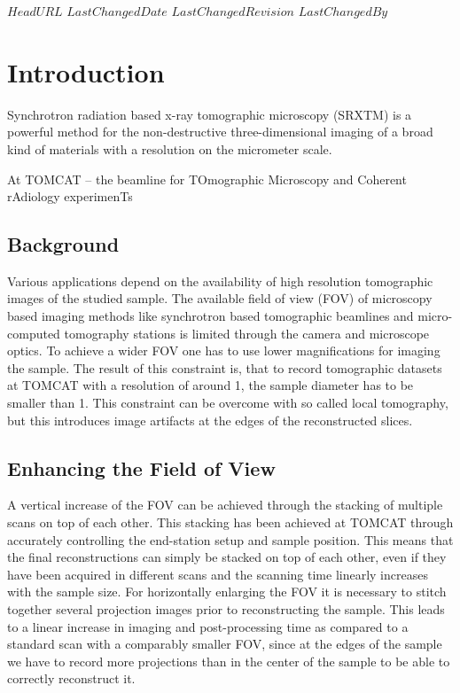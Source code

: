 \svnidlong
{$HeadURL$}
{$LastChangedDate$}
{$LastChangedRevision$}
{$LastChangedBy$}
\section{Introduction}

Synchrotron radiation based x-ray tomographic microscopy (SRXTM) is a powerful method for the non-destructive three-dimensional imaging of a broad kind of materials with a resolution on the micrometer scale.

At TOMCAT -- the beamline for TOmographic Microscopy and Coherent rAdiology experimenTs%

\subsection{Background}
Various applications depend on the availability of high resolution tomographic images of the studied sample. The available field of view (FOV) of microscopy based imaging methods like synchrotron based tomographic beamlines and micro-computed tomography stations is limited through the camera and microscope optics. To achieve a wider FOV one has to use lower magnifications for imaging the sample. The result of this constraint is, that to record tomographic datasets at TOMCAT with a resolution of around \unit{1}{\micro\meter}, the sample diameter has to be smaller than \unit{1}{\milli\meter}. This constraint can be overcome with so called local tomography, but this introduces image artifacts at the edges of the reconstructed slices.

\subsection{Enhancing the Field of View}
A vertical increase of the FOV can be achieved through the stacking of multiple scans on top of each other. This stacking has been achieved at TOMCAT through accurately controlling the end-station setup and sample position. This means that the final reconstructions can simply be stacked on top of each other, even if they have been acquired in different scans and the scanning time linearly increases with the sample size. For horizontally enlarging the FOV it is necessary to stitch together several projection images prior to reconstructing the sample. This leads to a linear increase in imaging and post-processing time as compared to a standard scan with a comparably smaller FOV, since at the edges of the sample we have to record more projections than in the center of the sample to be able to correctly reconstruct it. 